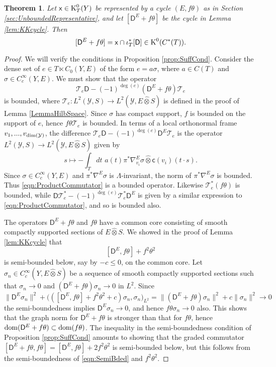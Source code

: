 \documentclass[11pt,reqno]{amsart}
\newtheorem{theorem}{Theorem}[section]
\theoremstyle{definition}
\theoremstyle{remark}
\newcommand{\wh}[1]{\widehat{#1}}
\newcommand{\st}[1]{\mathsf{#1}}
\def\T{\ensuremath{\mathcal{T}}}
\def\Y{\ensuremath{\mathcal{Y}}}
\def\K{\ensuremath{\mathcal{K}}}
\def\c{\ensuremath{\mathsf{c}}}
\def\dim{\ensuremath{\textnormal{dim}}}
\def\dom{\ensuremath{\textnormal{dom}}}
\def\K{\ensuremath{\textnormal{K}}}
\begin{document}
\begin{theorem}
\label{thm:CapProductResult}
Let $\st{x} \in \K^0_T(Y)$ be represented by a cycle $(E,f\theta)$ as in Section \ref{sec:UnboundedRepresentative}, and let $[\st{D}^E+f\theta]$ be the cycle in Lemma \ref{lem:KKcycle}.  Then
\[ [\st{D}^E+f\theta]=\st{x}\cap \iota_T^\ast [\st{D}] \in \K^0(C^\ast(T)). \]
\end{theorem}
\begin{proof}
We will verify the conditions in Proposition \ref{prop:SuffCond}.  Consider the dense set of $e \in T\ltimes C_0(Y,E)$ of the form $e=a\sigma$, where $a \in C(T)$ and $\sigma \in C_c^\infty(Y,E)$.  We must show that the operator
\[ \T_e \st{D}-(-1)^{\deg(e)}(\st{D}^E+f\theta)\T_e \]
is bounded, where $\T_e\colon L^2(\Y,S) \rightarrow L^2(\Y,E \wh{\otimes} S)$ is defined in the proof of Lemma \ref{LemmaHilbSpace}.  Since $\sigma$ has compact support, $f$ is bounded on the support of $e$, hence $f\theta \T_e$ is bounded.  In terms of a local orthonormal frame $v_1,...,v_{\dim(\Y)}$, the difference $\T_e \st{D}-(-1)^{\deg(e)}\st{D}^E\T_e$ is the operator $L^2(\Y,S) \rightarrow L^2(\Y,E\wh{\otimes}S)$ given by 
\begin{equation}
\label{eqn:ProductCommutator}
s \mapsto -\int_T dt \,\, a(t)\pi^\ast\nabla^E_{v_i}\sigma\wh{\otimes}\c(v_i)(t\cdot s).
\end{equation}
Since $\sigma \in C_c^\infty(Y,E)$ and $\pi^\ast \nabla^E \sigma$ is $\Lambda$-invariant, the norm of $\pi^\ast \nabla^E\sigma$ is bounded.  Thus \eqref{eqn:ProductCommutator} is a bounded operator.  Likewise $\T_e^\ast(f\theta)$ is bounded, while $\st{D}\T_e^\ast-(-1)^{\deg(e)}\T_e^\ast \st{D}^E$ is given by a similar expression to \eqref{eqn:ProductCommutator}, and so is bounded also.

The operators $\st{D}^E+f\theta$ and $f\theta$ have a common core consisting of smooth compactly supported sections of $E \wh{\otimes} S$.  We showed in the proof of Lemma \ref{lem:KKcycle} that 
\begin{equation}
\label{eqn:SemiBded}
[\st{D}^E,f\theta]+f^2\theta^2
\end{equation}
is semi-bounded below, say by $-c \le 0$, on the common core.  Let $\sigma_n \in C_c^\infty(Y,E\wh{\otimes}S)$ be a sequence of smooth compactly supported sections such that $\sigma_n \rightarrow 0$ and $(\st{D}^E+f\theta)\sigma_n \rightarrow 0$ in $L^2$.  Since
\[ \|\st{D}^E\sigma_n\|^2+\big(([\st{D}^E,f\theta]+f^2\theta^2+c)\sigma_n,\sigma_n\big)_{L^2}=\|(\st{D}^E+f\theta)\sigma_n\|^2+c\|\sigma_n\|^2 \rightarrow 0 \]
the semi-boundedness implies $\st{D}^E\sigma_n \rightarrow 0$, and hence $f\theta \sigma_n \rightarrow 0$ also.  This shows that the graph norm for $\st{D}^E+f\theta$ is stronger than that for $f\theta$, hence $\dom(\st{D}^E+f\theta) \subset \dom(f\theta)$.  The inequality in the semi-boundedness condition of Proposition \ref{prop:SuffCond} amounts to showing that the graded commutator $[\st{D}^E+f\theta,f\theta]=[\st{D}^E,f\theta]+2f^2\theta^2$ is semi-bounded below, but this follows from the semi-boundedness of \eqref{eqn:SemiBded} and $f^2\theta^2$.
\end{proof}
\end{document}
